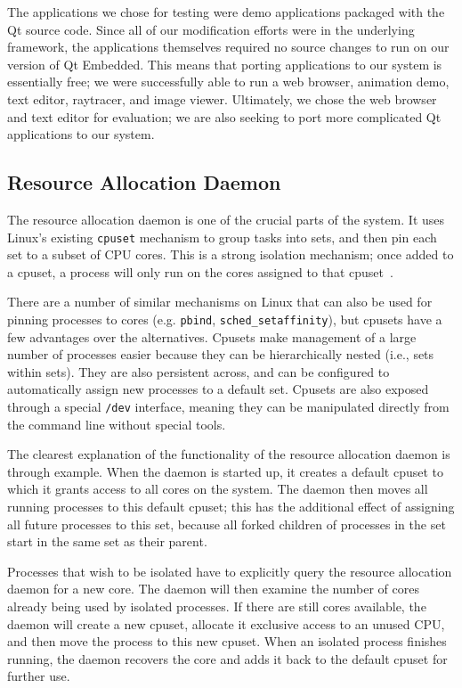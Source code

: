 \documentclass[letterpaper,twocolumn,11pt]{article}
\begin{document}
The applications we chose for testing were demo applications packaged with the Qt source code. Since all of our modification efforts were in the underlying framework, the applications themselves required no source changes to run on our version of Qt Embedded. This means that porting applications to our system is essentially free; we were successfully able to run a web browser, animation demo, text editor, raytracer, and image viewer. Ultimately, we chose the web browser and text editor for evaluation; we are also seeking to port more complicated Qt applications to our system.

\subsection{Resource Allocation Daemon}

The resource allocation daemon is one of the crucial parts of the system. It uses Linux's existing {\tt cpuset} mechanism to group tasks into sets, and then pin each set to a subset of CPU cores. This is a strong isolation mechanism; once added to a cpuset, a process will only run on the cores assigned to that cpuset~\cite{cpusets}.

There are a number of similar mechanisms on Linux that can also be used for pinning processes to cores (e.g. {\tt pbind}, {\tt sched\_setaffinity}), but cpusets have a few advantages over the alternatives. Cpusets make management of a large number of processes easier because they can be hierarchically nested (i.e., sets within sets). They are also persistent across, and can be configured to automatically assign new processes to a default set. Cpusets are also exposed through a special {\tt /dev} interface, meaning they can be manipulated directly from the command line without special tools.

The clearest explanation of the functionality of the resource allocation daemon is through example. When the daemon is started up, it creates a default cpuset to which it grants access to all cores on the system. The daemon then moves all running processes to this default cpuset; this has the additional effect of assigning all future processes to this set, because all forked children of processes in the set start in the same set as their parent.

Processes that wish to be isolated have to explicitly query the resource allocation daemon for a new core. The daemon will then examine the number of cores already being used by isolated processes. If there are still cores available, the daemon will create a new cpuset, allocate it exclusive access to an unused CPU, and then move the process to this new cpuset. When an isolated process finishes running, the daemon recovers the core and adds it back to the default cpuset for further use.
\end{document}
